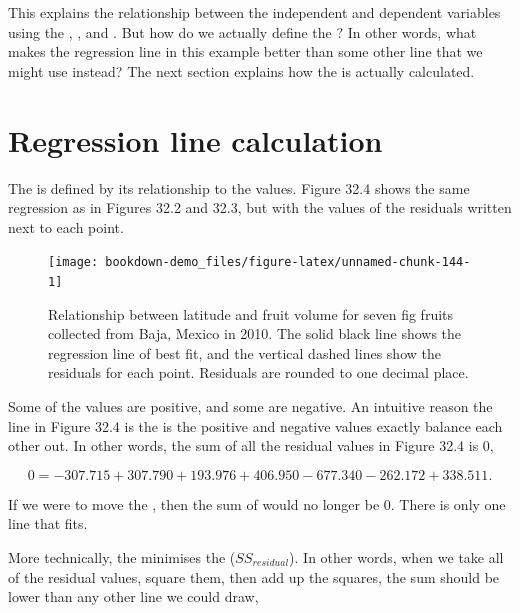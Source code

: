 \documentclass[
  openany]{krantz}
\begin{document}
This explains the relationship between the independent and dependent variables using the , , and .
But how do we actually define the ?
In other words, what makes the regression line in this example better than some other line that we might use instead?
The next section explains how the  is actually calculated.

\hypertarget{regression-line-calculation}{%
\section{Regression line calculation}\label{regression-line-calculation}}

The  is defined by its relationship to the  values.
Figure 32.4 shows the same regression as in Figures 32.2 and 32.3, but with the values of the residuals written next to each point.

\begin{figure}
\texttt{[image: bookdown-demo\_files/figure-latex/unnamed-chunk-144-1]} \caption{Relationship between latitude and fruit volume for seven fig fruits collected from Baja, Mexico in 2010. The solid black line shows the regression line of best fit, and the vertical dashed lines show the residuals for each point. Residuals are rounded to one decimal place.}\label{fig:unnamed-chunk-144}
\end{figure}

Some of the values are positive, and some are negative.
An intuitive reason the line in Figure 32.4 is the  is the positive and negative values exactly balance each other out.
In other words, the sum of all the residual values in Figure 32.4 is 0,

\[0 = -307.715 + 307.790 + 193.976 + 406.950 - 677.340 - 262.172 + 338.511.\]

If we were to move the , then the sum of  would no longer be 0.
There is only one line that fits.

More technically, the  minimises the  (\(SS_{residual}\)).
In other words, when we take all of the residual values, square them, then add up the squares, the sum should be lower than any other line we could draw,
\end{document}
